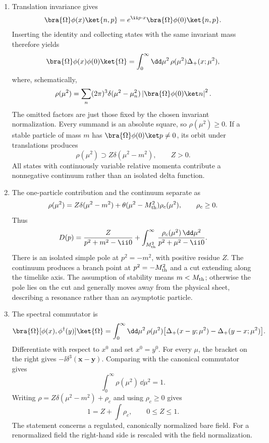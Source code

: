 
\begin{enumerate}
\begin{enumerate}
\item
Translation invariance gives
\[
 \bra{\Omega}\phi(x)\ket{n,p}
 =e^{\ii p\cdot x}\bra{\Omega}\phi(0)\ket{n,p}.
\]
Inserting the identity and collecting states with the same invariant mass
therefore yields
\[
 \bra{\Omega}\phi(x)\phi(0)\ket{\Omega}
 =\int_0^\infty \dd\mu^2\,\rho(\mu^2)
 \Delta_+(x;\mu^2),
\]
where, schematically,
\[
 \rho(\mu^2)=
 \sum_n(2\pi)^3\delta(\mu^2-\mu_n^2)
 \left|\bra{\Omega}\phi(0)\ket n\right|^2 .
\]
The omitted factors are just those fixed by the chosen invariant
normalization.  Every summand is an absolute square, so
\(\rho(\mu^2)\geq0\).  If a stable particle of mass \(m\) has
\(\bra{\Omega}\phi(0)\ket p\neq0\), its orbit under translations produces
\[
 \rho(\mu^2)\supset Z\delta(\mu^2-m^2),\qquad Z>0.
\]
All states with continuously variable relative momenta contribute a
nonnegative continuum rather than an isolated delta function.
\item
The one-particle contribution and the continuum separate as
\[
 \rho(\mu^2)=Z\delta(\mu^2-m^2)
 +\theta(\mu^2-M_{\rm th}^2)\rho_c(\mu^2),
\qquad \rho_c\geq0.
\]
Thus
\[
 D(p)=\frac{Z}{p^2+m^2-\ii0}
 +\int_{M_{\rm th}^2}^{\infty}
 \frac{\rho_c(\mu^2)\,\dd\mu^2}{p^2+\mu^2-\ii0}.
\]
There is an isolated simple pole at \(p^2=-m^2\), with positive residue
\(Z\).  The continuum produces a branch point at
\(p^2=-M_{\rm th}^2\) and a cut extending along the timelike axis.  The
assumption of stability means \(m<M_{\rm th}\); otherwise the pole lies on
the cut and generally moves away from the physical sheet, describing a
resonance rather than an asymptotic particle.
\item
The spectral commutator is
\[
 \bra{\Omega}[\phi(x),\phi^\dagger(y)]\ket{\Omega}
 =\int_0^\infty \dd\mu^2\,\rho(\mu^2)
 \bigl[\Delta_+(x-y;\mu^2)-\Delta_+(y-x;\mu^2)\bigr].
\]
Differentiate with respect to \(x^0\) and set \(x^0=y^0\).  For every
\(\mu\), the bracket on the right gives
\(-\ii\delta^3(\mathbf x-\mathbf y)\).  Comparing with the canonical
commutator gives
\[
 \boxed{\int_0^\infty\rho(\mu^2)\,\dd\mu^2=1.}
\]
Writing
\(\rho=Z\delta(\mu^2-m^2)+\rho_c\) and using
\(\rho_c\geq0\) gives
\[
 1=Z+\int\rho_c,\qquad 0\leq Z\leq1.
\]
The statement concerns a regulated, canonically normalized bare field.
For a renormalized field the right-hand side is rescaled with the field
normalization.
\end{enumerate}


\end{enumerate}
